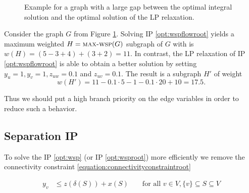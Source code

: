 \begin{figure}[H]
\begin{minipage}[t]{0.49\linewidth}
	\end{minipage}
	\caption{Example for a graph with a large gap between the optimal integral solution and the optimal solution of the LP relaxation.}
	\label{fig:wspflowgap}
\end{figure}

\begin{example}
	Consider the graph $G$ from Figure \ref{fig:wspflowgap}. Solving IP \eqref{opt:wspflowroot} yields a maximum weighted $H = \text{\textsc{max-wsp}}(G)$ subgraph of $G$ with is $w(H) = (5-3+4) + (3+2) = 11$.
	In contrast, the LP relaxation of IP \eqref{opt:wspflowroot} is able to obtain a better solution by setting 
	$y_u = 1, y_v = 1, z_{uw} = 0.1$ and $z_{uv} = 0.1$. The result is a subgraph $H'$ of weight 
	$$w(H') = 11 - 0.1 \cdot 5 - 1 - 0.1 \cdot 20 + 10 = 17.5.$$
\end{example}

Thus we should put a high branch priority on the edge variables in order to reduce such a behavior. 


\subsection{Separation IP}
\label{sec:integer:seperation}

To solve the IP \eqref{opt:wsp} (or IP \eqref{opt:wsproot}) more efficiently we remove the connectivity constraint \eqref{equation:connectivityconstraintroot}

\begin{align*}
	y_v &\leq z(\delta(S)) + x(S) &&\text{ for all } v \in V, \{v\} \subseteq S \subseteq V
\end{align*}

